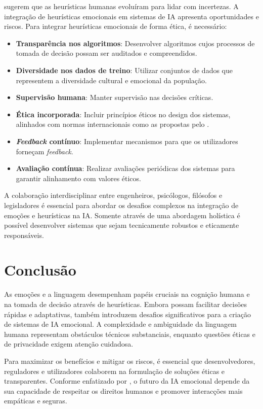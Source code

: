 \documentclass[a4paper,12pt]{report}
\begin{document}
	\textcite{gigerenzer2009} sugerem que as heurísticas humanas evoluíram para lidar com incertezas. A integração de heurísticas emocionais em sistemas de IA apresenta oportunidades e riscos. Para integrar heurísticas emocionais de forma ética, é necessário:
	
	\begin{itemize}
		\item \textbf{Transparência nos algoritmos}: Desenvolver algoritmos cujos processos de tomada de decisão possam ser auditados e compreendidos.
		\item \textbf{Diversidade nos dados de treino}: Utilizar conjuntos de dados que representem a diversidade cultural e emocional da população.
		\item \textbf{Supervisão humana}: Manter supervisão nas decisões críticas.
		\item \textbf{Ética incorporada}: Incluir princípios éticos no design dos sistemas, alinhados com normas internacionais como as propostas pelo \textcite{ieee2019}.
		\item \textbf{\textit{Feedback} contínuo}: Implementar mecanismos para que os utilizadores forneçam \textit{feedback}.
		\item \textbf{Avaliação contínua}: Realizar avaliações periódicas dos sistemas para garantir alinhamento com valores éticos.
	\end{itemize}
	
	A colaboração interdisciplinar entre engenheiros, psicólogos, filósofos e legisladores é essencial para abordar os desafios complexos na integração de emoções e heurísticas na IA. Somente através de uma abordagem holística é possível desenvolver sistemas que sejam tecnicamente robustos e eticamente responsáveis.
	
	\section{Conclusão}
	
	As emoções e a linguagem desempenham papéis cruciais na cognição humana e na tomada de decisão através de heurísticas. Embora possam facilitar decisões rápidas e adaptativas, também introduzem desafios significativos para a criação de sistemas de IA emocional. A complexidade e ambiguidade da linguagem humana representam obstáculos técnicos substanciais, enquanto questões éticas e de privacidade exigem atenção cuidadosa.
	
	Para maximizar os benefícios e mitigar os riscos, é essencial que desenvolvedores, reguladores e utilizadores colaborem na formulação de soluções éticas e transparentes. Conforme enfatizado por \textcite{russell2020}, o futuro da IA emocional depende da sua capacidade de respeitar os direitos humanos e promover interacções mais empáticas e seguras.
	
\end{document}
